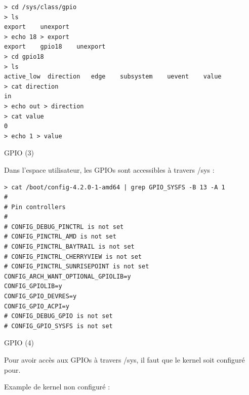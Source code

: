 \documentclass[12pt, t]{beamer}
\begin{document}
{
    \begin{lstlisting}
> cd /sys/class/gpio
> ls
export    unexport
> echo 18 > export
export    gpio18    unexport
> cd gpio18
> ls
active_low  direction   edge    subsystem    uevent    value
> cat direction
in
> echo out > direction
> cat value
0
> echo 1 > value
    \end{lstlisting}
}

\begin{frame}{GPIO (3)}

    \vspace{3pt}
    Dans l'espace utilisateur, les GPIOs sont accessibles à travers /sys :
    \vspace{3pt}

    {
        \lstsysgpio
    }

\end{frame}

{
    \begin{lstlisting}[basicstyle=\scriptsize]
> cat /boot/config-4.2.0-1-amd64 | grep GPIO_SYSFS -B 13 -A 1
#
# Pin controllers
#
# CONFIG_DEBUG_PINCTRL is not set
# CONFIG_PINCTRL_AMD is not set
# CONFIG_PINCTRL_BAYTRAIL is not set
# CONFIG_PINCTRL_CHERRYVIEW is not set
# CONFIG_PINCTRL_SUNRISEPOINT is not set
CONFIG_ARCH_WANT_OPTIONAL_GPIOLIB=y
CONFIG_GPIOLIB=y
CONFIG_GPIO_DEVRES=y
CONFIG_GPIO_ACPI=y
# CONFIG_DEBUG_GPIO is not set
# CONFIG_GPIO_SYSFS is not set
    \end{lstlisting}
}

\begin{frame}{GPIO (4)}

    \vspace{10pt}
    Pour avoir accès aux GPIOs à travers /sys, il faut que le kernel soit
    configuré pour.

    {
        \vspace{10pt}
        Example de kernel non configuré :
        \vspace{5pt}
        \lstconfgpio
    }

\end{frame}
\end{document}
